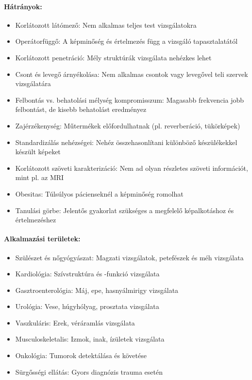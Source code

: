 \documentclass[a4paper,12pt]{article}
\begin{document}
\paragraph{Hátrányok:} \begin{itemize} \item Korlátozott látómező: Nem alkalmas teljes test vizsgálatokra \item Operátorfüggő: A képminőség és értelmezés függ a vizsgáló tapasztalatától \item Korlátozott penetráció: Mély struktúrák vizsgálata nehézkes lehet \item Csont és levegő árnyékolása: Nem alkalmas csontok vagy levegővel teli szervek vizsgálatára \item Felbontás vs. behatolási mélység kompromisszum: Magasabb frekvencia jobb felbontást, de kisebb behatolást eredményez \item Zajérzékenység: Műtermékek előfordulhatnak (pl. reverberáció, tükörképek) \item Standardizálás nehézségei: Nehéz összehasonlítani különböző készülékekkel készült képeket \item Korlátozott szöveti karakterizáció: Nem ad olyan részletes szöveti információt, mint pl. az MRI \item Obesitas: Túlsúlyos pácienseknél a képminőség romolhat \item Tanulási görbe: Jelentős gyakorlat szükséges a megfelelő képalkotáshoz és értelmezéshez \end{itemize}

\paragraph{Alkalmazási területek:} \begin{itemize} \item Szülészet és nőgyógyászat: Magzati vizsgálatok, petefészek és méh vizsgálata \item Kardiológia: Szívstruktúra és -funkció vizsgálata \item Gasztroenterológia: Máj, epe, hasnyálmirigy vizsgálata \item Urológia: Vese, húgyhólyag, prosztata vizsgálata \item Vaszkuláris: Erek, véráramlás vizsgálata \item Musculoskeletalis: Izmok, inak, ízületek vizsgálata \item Onkológia: Tumorok detektálása és követése \item Sürgősségi ellátás: Gyors diagnózis trauma esetén \end{itemize}
\end{document}
